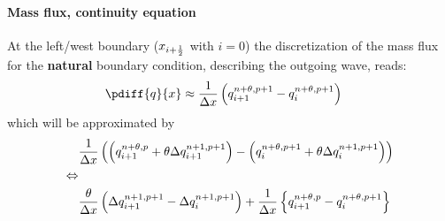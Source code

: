 \paragraph*{Mass flux, continuity equation}
At the left/west boundary ($x_{i+\frac{1}{2}}$ with $i=0$) the discretization of the mass flux for the \textbf{natural} boundary condition, describing the outgoing wave, reads:
\begin{align}
    \pdiff{q}{x} & \approx \frac{1}{\Dx} \left(  q^{n+\theta, p+1}_{i+1} - q^{n+\theta, p+1}_{i} \right)
\end{align}
which will be approximated by
\begin{align}
&\frac{1}{\Delta x} \left( \left( q^{n+\theta, p}_{i+1} + \theta \Delta q^{n+1, p+1}_{i+1}\right)
- \left( q^{n+\theta, p+1}_{i} + \theta \Delta q^{n+1, p+1}_{i}\right) \right)
\\
\Leftrightarrow &
\\
&\frac{\theta }{\Delta x} \left( \Delta q^{n+1, p+1}_{i+1} - \Delta q^{n+1, p+1}_{i}\right) +
\frac{1}{\Delta x} \left\{ q^{n+\theta, p}_{i+1} - q^{n+\theta, p+1}_{i} \right\}
\end{align}
